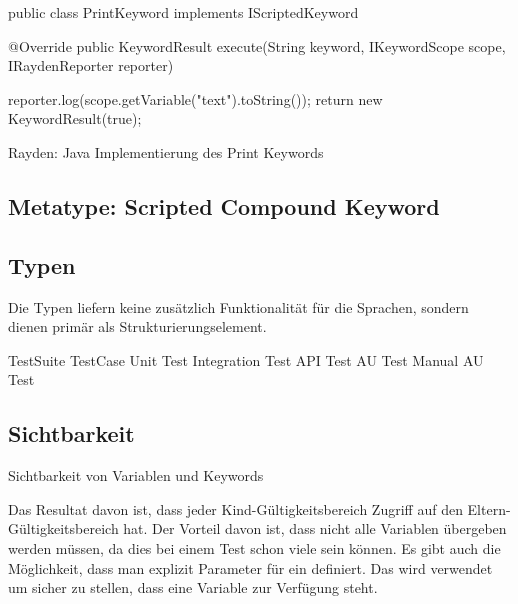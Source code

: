 \begin{program}
\begin{JavaCode}
public class PrintKeyword implements IScriptedKeyword {

	@Override
	public KeywordResult execute(String keyword, 
			IKeywordScope scope, IRaydenReporter reporter) {
			
		reporter.log(scope.getVariable("text").toString());
		return new KeywordResult(true);
	}
}
\end{JavaCode}
\caption{Rayden: Java Implementierung des Print Keywords}
\label{prog:scriptedKeyword}
\end{program}



\todo


\subsection{Metatype: Scripted Compound Keyword}

\todo

\subsection{Typen}
\label{cha:KeywordTypes}

Die Typen liefern keine zusätzlich Funktionalität für die Sprachen, sondern dienen primär als Strukturierungselement.

TestSuite
TestCase
Unit Test
Integration Test
API Test
AU Test
Manual AU Test

\todo

\subsection{Sichtbarkeit}
\label{cha:KeywordScope}

Sichtbarkeit von Variablen und Keywords

\todo

 Das Resultat davon ist, dass jeder Kind-Gültigkeitsbereich Zugriff auf den Eltern-Gültigkeitsbereich hat. Der Vorteil davon ist, dass nicht alle Variablen übergeben werden müssen, da dies bei einem Test schon viele sein können. Es gibt auch die Möglichkeit, dass man explizit Parameter für ein  definiert. Das wird verwendet um sicher zu stellen, dass eine Variable zur Verfügung steht.

